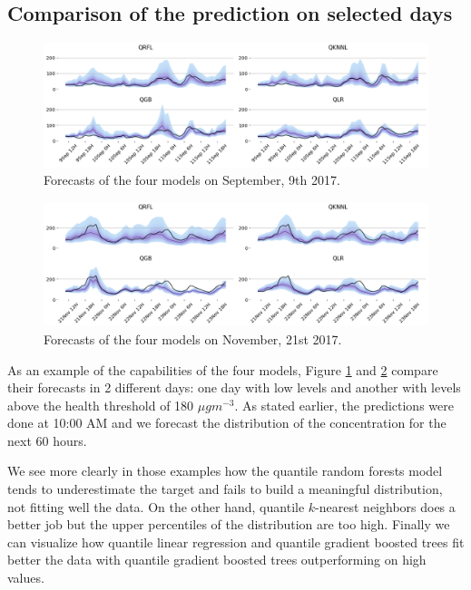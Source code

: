 \documentclass[a4paper,3p,sort&compress]{elsarticle}
\begin{document}
\subsection{Comparison of the prediction on selected days}

\begin{figure}
  \centering
  \includegraphics[width=1\textwidth]{evoday1}
  \caption{Forecasts of the four models on September, 9th
    2017.}
  \label{figure:evoday1} 
\end{figure}

\begin{figure}
  \centering
  \includegraphics[width=1\textwidth]{evoday2}
  \caption{Forecasts of the four models on November, 21st 2017.}
  \label{figure:evoday2} 
\end{figure}

As an example of the capabilities of the four models, Figure
\ref{figure:evoday1} and \ref{figure:evoday2} compare their forecasts
in 2 different days: one day with low \no levels and another with
levels above the health threshold of 180 $\mu gm^{-3}$.  As stated
earlier, the predictions were done at 10:00 AM and we forecast the
distribution of the concentration for the next 60 hours.

We see more clearly in those examples how the quantile random forests
model tends to underestimate the target and fails to build a
meaningful distribution, not fitting well the data. On the other hand,
quantile $k$-nearest neighbors does a better job but the upper
percentiles of the distribution are too high.  Finally we can
visualize how quantile linear regression and quantile gradient boosted
trees fit better the data with quantile gradient boosted trees
outperforming on high values.
\end{document}
